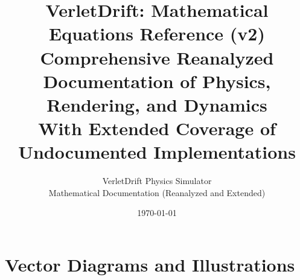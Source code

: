 \documentclass[12pt,a4paper]{article}
\title{%
  VerletDrift: Mathematical Equations Reference (v2) \\
  \large Comprehensive Reanalyzed Documentation of Physics, Rendering, and Dynamics \\
  \normalsize With Extended Coverage of Undocumented Implementations
}
\author{%
  VerletDrift Physics Simulator \\
  Mathematical Documentation (Reanalyzed and Extended)
}
\date{\today}
\begin{document}
\maketitle


\tableofcontents
\newpage

















\appendix



\newpage
\section*{Vector Diagrams and Illustrations}



\newpage


\end{document}
